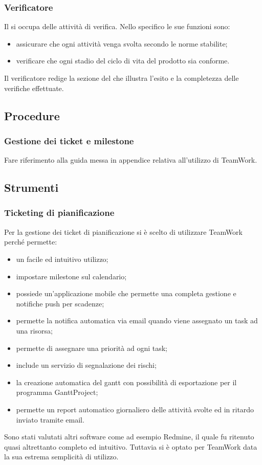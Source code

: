 		\subsubsection{Verificatore}
			Il  si occupa delle attività di verifica. Nello specifico le sue funzioni sono:
			\begin{itemize}
				\item assicurare che ogni attività venga svolta secondo le norme stabilite;
				\item verificare che ogni stadio del ciclo di vita del prodotto sia conforme.
			\end{itemize}
			Il verificatore redige la sezione del  che illustra l’esito e la completezza delle verifiche effettuate.
			\subsection{Procedure}
				\subsubsection{Gestione dei ticket e milestone}
					Fare riferimento alla guida messa in appendice relativa all'utilizzo di TeamWork.
			\subsection{Strumenti}
				\subsubsection{Ticketing di pianificazione}
					Per la gestione dei ticket di pianificazione si è scelto di utilizzare TeamWork perché permette:
					\begin{itemize}
						\item un facile ed intuitivo utilizzo;
						\item impostare milestone sul calendario;
						\item possiede un'applicazione mobile che permette una completa gestione e notifiche push per scadenze;
						\item permette la notifica automatica via email quando viene assegnato un task ad una risorsa;
						\item permette di assegnare una priorità ad ogni task;
						\item include un servizio di segnalazione dei rischi;
						\item la creazione automatica del gantt con possibilità di esportazione per il programma GanttProject;
						\item permette un report automatico giornaliero delle attività svolte ed in ritardo inviato tramite email.
					\end{itemize}
					Sono stati valutati altri software come ad esempio Redmine, il quale fu ritenuto quasi altrettanto completo ed intuitivo. Tuttavia si è optato per TeamWork data la sua estrema semplicità di utilizzo.\\
